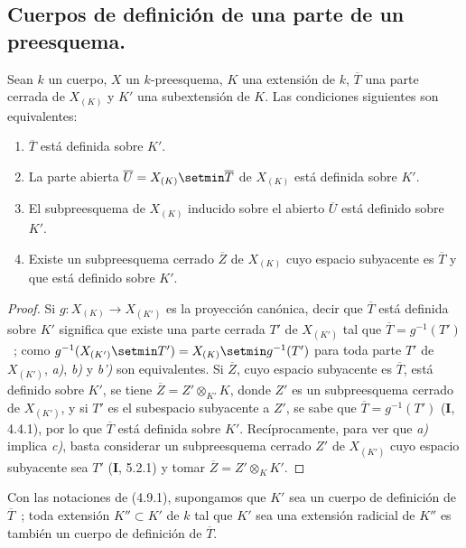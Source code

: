 \subsection{Cuerpos de definición de una parte de un preesquema.}

\begin{proposition}[4.9.1]
\label{IV.2.4.9.1-fr}
Sean $k$ un cuerpo, $X$ un $k$-preesquema, $K$ una extensión de $k$,
$\overline T$ una parte cerrada de $X_{(K)}$ y $K'$ una subextensión de $K$.
Las condiciones siguientes son equivalentes:
\begin{enumerate}
\item[\textup{a)}] $\overline T$ está definida sobre $K'$.
\item[\textup{b)}] La parte abierta $\overline U=X_{(K)}\setmin\overline T$ de $X_{(K)}$
está definida sobre $K'$.
\item[\textup{b')}] El subpreesquema de $X_{(K)}$ inducido sobre el abierto
$\overline U$ está definido sobre $K'$.
\item[\textup{c)}] Existe un subpreesquema cerrado $\overline Z$ de $X_{(K)}$ cuyo
espacio subyacente es $\overline T$ y que está definido sobre $K'$.
\end{enumerate}
\end{proposition}

\begin{proof}
Si $g:X_{(K)}\to X_{(K')}$ es la proyección canónica, decir que
$\overline T$ está definida sobre $K'$ significa que existe una parte cerrada
$T'$ de $X_{(K')}$ tal que $\overline T=g^{-1}(T')$~; como
$g^{-1}(X_{(K')}\setmin T')=X_{(K)}\setmin g^{-1}(T')$ para toda parte $T'$ de
$X_{(K')}$, \emph{a)}, \emph{b)} y \emph{b')} son equivalentes. Si $\overline Z$, cuyo espacio
subyacente es $\overline T$, está definido sobre $K'$, se tiene
$\overline Z=Z'\otimes_{K'}K$, donde $Z'$ es un subpreesquema cerrado de
$X_{(K')}$, y si $T'$ es el subespacio subyacente a $Z'$, se sabe que
$\overline T=g^{-1}(T')$ (\textbf I, 4.4.1), por lo que $\overline T$ está definida
sobre $K'$. Recíprocamente, para ver que \emph{a)} implica \emph{c)}, basta considerar un
subpreesquema cerrado $Z'$ de $X_{(K')}$ cuyo espacio subyacente sea $T'$
(\textbf I, 5.2.1) y tomar $\overline Z=Z'\otimes_KK'$.
\end{proof}

\begin{corollary}[4.9.2]
\label{IV.2.4.9.2-fr}
Con las notaciones de \textup{(4.9.1)}, supongamos que $K'$ sea un cuerpo de definición
de $\overline T$~; toda extensión $K''\subset K'$ de $k$ tal que $K'$ sea una
extensión radicial de $K''$ es también un cuerpo de definición de
$\overline T$.
\end{corollary}

